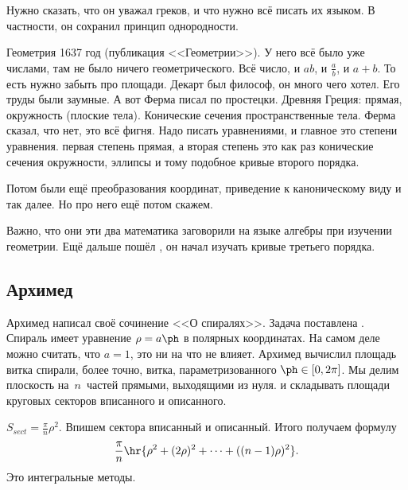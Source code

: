 \documentclass[a4paper,oneside,fleqn,10pt]{article}
\begin{document}
Нужно сказать, что он уважал греков, и что нужно всё писать их языком.
В частности, он сохранил принцип однородности.

Геометрия  1637 год (публикация <<Геометрии>>).
У него всё было уже числами, там не было ничего геометрического.
Всё число, и $ab$, и $\frac ab$, и $a+b$. То есть нужно забыть про площади.
Декарт был философ, он много чего хотел. Его труды были заумные.
А вот Ферма писал по простецки. Древняя Греция: прямая, окружность (плоские тела).
Конические сечения пространственные тела. Ферма сказал, что
нет, это всё фигня. Надо писать уравнениями, и главное это степени уравнения.
первая степень прямая, а вторая степень это как раз конические сечения окружности,
эллипсы и тому подобное кривые второго порядка.

Потом были ещё преобразования координат, приведение к каноническому виду и так далее.
Но про него ещё потом скажем.

Важно, что они эти два математика заговорили на языке алгебры при изучении геометрии.
Ещё дальше пошёл , он начал изучать
кривые третьего порядка.


\subsection{Архимед}

Архимед написал своё сочинение <<О спиралях>>. Задача поставлена  .
Спираль имеет уравнение $\rho = a\ph$ в полярных координатах. На самом деле можно считать,
что $a = 1$, это ни на что не влияет. Архимед вычислил площадь
витка спирали, более точно, витка, параметризованного $\ph \in [0,2\pi]$.
Мы делим плоскость на~$n$~частей прямыми, выходящими из нуля. и складывать
площади круговых секторов вписанного и описанного.

$S_{sect} = \frac{\pi}{n}\rho^2$. Впишем сектора вписанный и описанный.
Итого получаем формулу
$$\frac\pi n \hr{\rho^2 + (2\rho)^2 + \dots + ((n-1)\rho)^2}.$$
Это интегральные методы.
\end{document}
